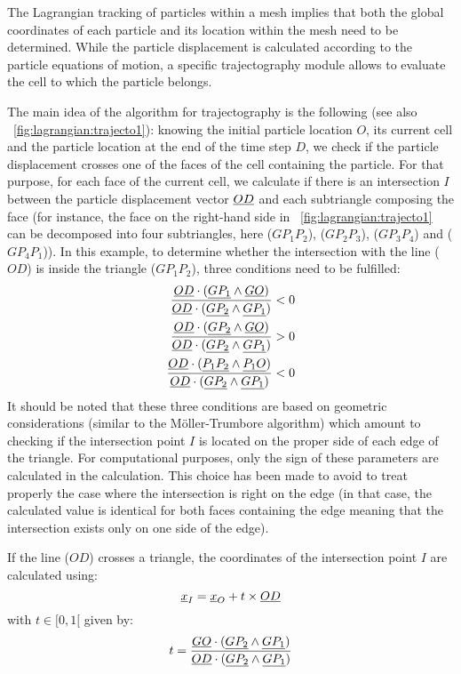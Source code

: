 The Lagrangian tracking of particles within a mesh implies that both the global coordinates of each particle and its location within the mesh need to be determined. While the particle displacement is calculated according to the particle equations of motion, a specific trajectography module allows to evaluate the cell to which the particle belongs.

The main idea of the algorithm for trajectography is the following (see also \figurename{}~\ref{fig:lagrangian:trajecto1}): knowing the initial particle location $O$, its current cell and the particle location at the end of the time step $D$, we check if the particle displacement crosses one of the faces of the cell containing the particle. For that purpose, for each face of the current cell, we calculate if there is an intersection $I$ between the particle displacement vector $\underline{OD}$ and each subtriangle composing the face (for instance, the face on the right-hand side in \figurename{}~\ref{fig:lagrangian:trajecto1} can be decomposed into four subtriangles, here ($GP_1P_2$), ($GP_2P_3$), ($GP_3P_4$) and ($GP_4P_1$)). In this example, to determine whether the intersection with the line ($OD$) is inside the triangle ($GP_1P_2$), three conditions need to be fulfilled:
\begin{subequations}
\begin{align}
 \frac{\underline{OD}\cdot(\underline{GP_1}\wedge\underline{GO})}{\underline{OD}\cdot(\underline{GP_2}\wedge\underline{GP_1})} < 0 \\
 \frac{\underline{OD}\cdot(\underline{GP_2}\wedge\underline{GO})}{\underline{OD}\cdot(\underline{GP_2}\wedge\underline{GP_1})} > 0  \\
 \frac{\underline{OD}\cdot(\underline{P_1P_2}\wedge\underline{P_1O})}{\underline{OD}\cdot(\underline{GP_2}\wedge\underline{GP_1})} < 0
\end{align}
\label{eq:lagrangian:trajecto_1}
\end{subequations}
It should be noted that these three conditions are based on geometric considerations (similar to the M\"{o}ller-Trumbore algorithm) which amount to checking if the intersection point $I$ is located on the proper side of each edge of the triangle. For computational purposes, only the sign of these parameters are calculated in the calculation. This choice has been made to avoid to treat properly the case where the intersection is right on the edge (in that case, the calculated value is identical for both faces containing the edge meaning that the intersection exists only on one side of the edge).

If the line ($OD$) crosses a triangle, the coordinates of the intersection point $I$ are calculated using:
\begin{equation}
 \underline{x}_I = \underline{x}_O + t \times \underline{OD}
\label{eq:lagrangian:trajecto_2}
\end{equation}
with $t\in [0,1[$ given by:
\begin{equation}
 t =  \frac{\underline{GO}\cdot(\underline{GP_2}\wedge\underline{GP_1})}{\underline{OD}\cdot(\underline{GP_2}\wedge\underline{GP_1})}
\label{eq:lagrangian:trajecto_3}
\end{equation}

